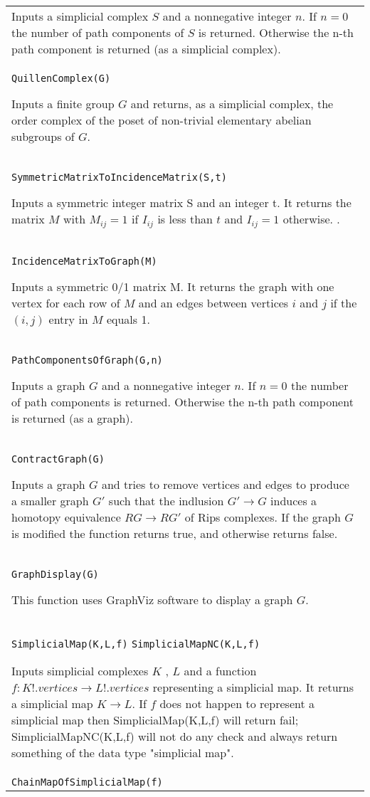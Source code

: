 \documentclass[a4paper,11pt]{report}
\begin{document}
{\begin{center}
\begin{tabular}{|l|}
 Inputs a simplicial complex $S$ and a nonnegative integer $n$. If $n=0$ the number of path components of $S$ is returned. Otherwise the n-th path component is returned (as a simplicial
complex). \\
 \index{QuillenComplex} \texttt{QuillenComplex(G)} 

 Inputs a finite group $G$ and returns, as a simplicial complex, the order complex of the poset of
non-trivial elementary abelian subgroups of $G$. \\
 \index{SymmetricMatrixToIncidenceMatrix} \texttt{SymmetricMatrixToIncidenceMatrix(S,t)} 

 Inputs a symmetric integer matrix S and an integer t. It returns the matrix $M$ with $M_{ij}=1$ if $I_{ij}$ is less than $ t$ and $I_{ij}=1$ otherwise. . \\
 \index{IncidenceMatrixToGraph} \texttt{IncidenceMatrixToGraph(M)} 

 Inputs a symmetric 0/1 matrix M. It returns the graph with one vertex for each
row of $M$ and an edges between vertices $i$ and $j$ if the $(i,j)$ entry in $M$ equals 1. \\
 \index{PathComponentsOfGraph} \texttt{PathComponentsOfGraph(G,n)} 

 Inputs a graph $G$ and a nonnegative integer $n$. If $n=0$ the number of path components is returned. Otherwise the n-th path component
is returned (as a graph). \\
 \index{ContractGraph} \texttt{ContractGraph(G)} 

 Inputs a graph $G$ and tries to remove vertices and edges to produce a smaller graph $G'$ such that the indlusion $G' \rightarrow G$ induces a homotopy equivalence $RG \rightarrow RG'$ of Rips complexes. If the graph $G$ is modified the function returns true, and otherwise returns false. \\
 \index{GraphDisplay} \texttt{GraphDisplay(G)} 

 This function uses GraphViz software to display a graph $G$. \\
 \index{SimplicialMap} \index{SimplicialMapNC} \texttt{SimplicialMap(K,L,f)} \texttt{SimplicialMapNC(K,L,f)} 

 Inputs simplicial complexes $K$ , $L$ and a function $f\colon K!.vertices \rightarrow L!.vertices$ representing a simplicial map. It returns a simplicial map $K \rightarrow L$. If $f$ does not happen to represent a simplicial map then SimplicialMap(K,L,f) will
return fail; SimplicialMapNC(K,L,f) will not do any check and always return
something of the data type "simplicial map". \\
 \index{ChainMapOfSimplicialMap} \texttt{ChainMapOfSimplicialMap(f)} 


\end{tabular}
\end{center}}
\end{document}
